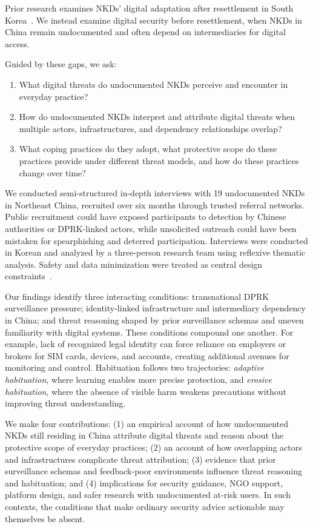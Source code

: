 \documentclass[conference,compsoc]{IEEEtran}
\begin{document}
Prior research examines NKDs' digital adaptation after resettlement in South Korea~\cite{noh2024starting,noh2025bridging}. We instead examine digital security before resettlement, when NKDs in China remain undocumented and often depend on intermediaries for digital access.

Guided by these gaps, we ask:
\begin{enumerate}[leftmargin=*, label=RQ\arabic*:]
  \item What digital threats do undocumented NKDs perceive and encounter in everyday practice?
  \item How do undocumented NKDs interpret and attribute digital threats when multiple actors, infrastructures, and dependency relationships overlap?
  \item What coping practices do they adopt, what protective scope do these practices provide under different threat models, and how do these practices change over time?
\end{enumerate}

We conducted semi-structured in-depth interviews with 19 undocumented NKDs in Northeast China, recruited over six months through trusted referral networks. Public recruitment could have exposed participants to detection by Chinese authorities or DPRK-linked actors, while unsolicited outreach could have been mistaken for spearphishing and deterred participation. Interviews were conducted in Korean and analyzed by a three-person research team using reflexive thematic analysis. Safety and data minimization were treated as central design constraints~\cite{bellini2024sok}.

Our findings identify three interacting conditions: transnational DPRK surveillance pressure; identity-linked infrastructure and intermediary dependency in China; and threat reasoning shaped by prior surveillance schemas and uneven familiarity with digital systems. These conditions compound one another. For example, lack of recognized legal identity can force reliance on employers or brokers for SIM cards, devices, and accounts, creating additional avenues for monitoring and control. Habituation follows two trajectories: \emph{adaptive habituation}, where learning enables more precise protection, and \emph{erosive habituation}, where the absence of visible harm weakens precautions without improving threat understanding.

We make four contributions: (1) an empirical account of how undocumented NKDs still residing in China attribute digital threats and reason about the protective scope of everyday practices; (2) an account of how overlapping actors and infrastructures complicate threat attribution; (3) evidence that prior surveillance schemas and feedback-poor environments influence threat reasoning and habituation; and (4) implications for security guidance, NGO support, platform design, and safer research with undocumented at-risk users. In such contexts, the conditions that make ordinary security advice actionable may themselves be absent.
\end{document}
